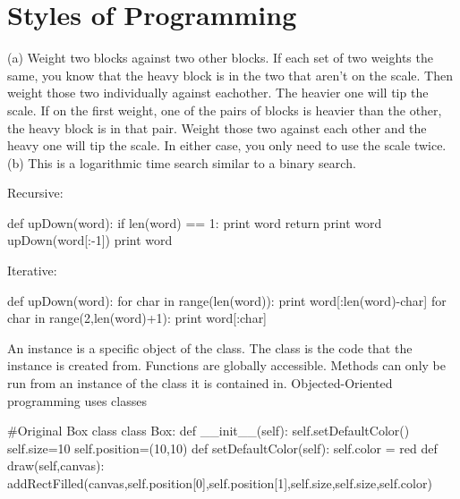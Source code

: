 \chapter{Styles of Programming}
\begin{exercises}

\begin{ex} %
(a) Weight two blocks against two other blocks.  If each set of two weights
the same, you know that the heavy block is in the two that
aren't on the scale.  Then weight those two individually against eachother.
The heavier one will tip the scale.  If on the first weight,
one of the pairs of blocks is heavier than the other, the heavy block is in
that pair.  Weight those two against each other and the heavy
one will tip the scale.  In either case, you only need to use the scale
twice.
\newline
(b) This is a logarithmic time search similar to a binary search.
\end{ex}

\begin{ex} %
\end{ex}

\begin{ex} %
Recursive:
\begin{example}
def upDown(word):
  if len(word) == 1:
    print word
    return
  print word
  upDown(word[:-1])
  print word
\end{example}

Iterative:
\begin{example}
def upDown(word):
  for char in range(len(word)):
    print word[:len(word)-char]
  for char in range(2,len(word)+1):
    print word[:char]  
\end{example}
\end{ex}

\begin{ex} %
\end{ex}

\begin{ex} %
\end{ex}

\begin{ex} %
An instance is a specific object of the class.  The class is the code that
the instance is created from.
Functions are globally accessible.  Methods can only be run from an
instance of the class it is contained in.
Objected-Oriented programming uses classes 
\end{ex}

\begin{ex} %
\begin{example}
#Original Box class
class Box:
  def \_\_init\_\_(self):
    self.setDefaultColor()
    self.size=10
    self.position=(10,10)
  def setDefaultColor(self):
    self.color = red
  def draw(self,canvas):
    addRectFilled(canvas,self.position[0],self.position[1],self.size,self.size,self.color)


\end{example}
\end{ex}
\end{exercises}
